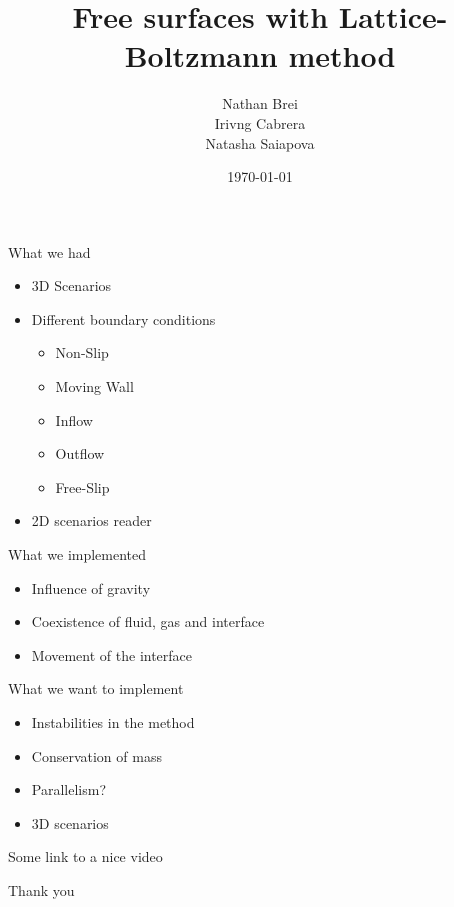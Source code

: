 \documentclass[10pt,a4paper]{beamer}
\author{ Nathan Brei \\ Irivng Cabrera \\ Natasha Saiapova}
\institute[TUM]{TU München}
\date{\today}
\title{Free surfaces with Lattice-Boltzmann method}
\begin{document}
\begin{frame}
	\maketitle
\end{frame}
\begin{frame}
	\tableofcontents
\end{frame}
\begin{frame}
	What we had
	\begin{itemize}
	\item 3D Scenarios
	\item Different boundary conditions
		\begin{itemize}
		\item Non-Slip  
		\item Moving Wall 
		\item Inflow
		\item Outflow
		\item Free-Slip
		\end{itemize}
	\item 2D scenarios reader
	\end{itemize}
\end{frame}
\begin{frame}
	What we implemented
	\begin{itemize}
	\item Influence of gravity
	\item Coexistence of fluid, gas and interface 
	\item Movement of the interface
	\end{itemize}
\end{frame}
\begin{frame}
	What we want to implement
	\begin{itemize}
	\item Instabilities in the method
	\item Conservation of mass
	\item Parallelism?
	\item 3D scenarios
	\end{itemize}
\end{frame}
\begin{frame}
	Some link to a nice video
\end{frame}
\begin{frame}
Thank you
\end{frame}
\end{document}
